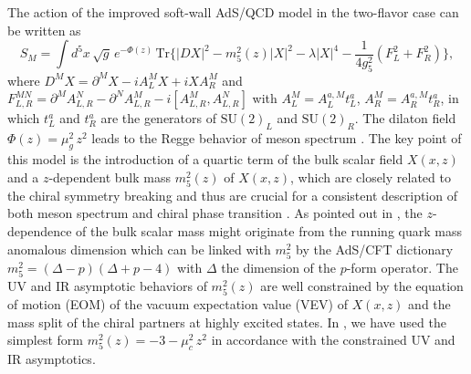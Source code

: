 \documentclass[11pt,a4paper,psfrag]{article}
\begin{document}
The action of the improved soft-wall AdS/QCD model in the two-flavor case \cite{Fang:2016nfj} can be written as
\begin{equation}\label{meson-action}
S_M=\int d^{5}x\,\sqrt{g}\,e^{-\Phi(z)}\,{\mathrm{Tr}}\{|DX|^{2}-m_5^2(z)|X|^{2}
-\lambda |X|^{4}-\frac{1}{4g_{5}^2}(F_{L}^2+F_{R}^2)\},
\end{equation}
where $D^MX=\partial^MX-i A_L^MX+i X A_R^M$ and $F_{L,R}^{MN}=\partial^MA_{L,R}^N-\partial^NA_{L,R}^M-i[A_{L,R}^M,A_{L,R}^N]$ with
$A_L^M=A_L^{a,M}t_L^a$, $A_R^M=A_R^{a,M}t_R^a$, in which $t_L^a$ and $t_R^a $ are the generators of $\mathrm{SU}(2)_L$ and $\mathrm{SU}(2)_R$. The dilaton field $\Phi(z)=\mu_g^2\,z^2$ leads to the Regge behavior of meson spectrum \cite{Karch:2006pv}. The key point of this model is the introduction of a quartic term of the bulk scalar field $X(x,z)$ and a $z$-dependent bulk mass $m_5^2(z)$ of $X(x,z)$, which are closely related to the chiral symmetry breaking and thus are crucial for a consistent description of both meson spectrum and chiral phase transition \cite{Fang:2016nfj}. As pointed out in \cite{Fang:2016nfj}, the $z$-dependence of the bulk scalar mass might originate from the running quark mass anomalous dimension which can be linked with $m_5^2$ by the AdS/CFT dictionary $m_5^2=(\Delta-p)(\Delta+p-4)$ with $\Delta$ the dimension of the $p$-form operator. The UV and IR asymptotic behaviors of $m_5^2(z)$ are well constrained by the equation of motion (EOM) of the vacuum expectation value (VEV) of $X(x,z)$ and the mass split of the chiral partners at highly excited states. In \cite{Fang:2016nfj}, we have used the simplest form $m_5^2(z)=-3-\mu_c^2\,z^2$ in accordance with the constrained UV and IR asymptotics.
\end{document}
